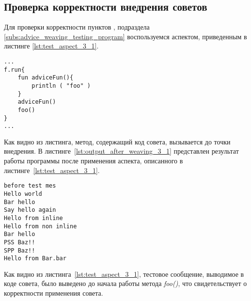 \subsection{Проверка корректности внедрения советов}
\label{sub:advice_code_weaving_tests}
Для проверки корректности пунктов \quotes{\ref{list:before_advice_weaving_check}},
\quotes{\ref{list:program_work_check}}  подраздела \ref{subs:advice_weaving_testing_program} воспользуемся аспектом, приведенным в листинге \ref{lst:test_aspect_3_1}.
\begin{lstlisting}[style={java}, label={lst:result_of_weaving_3_1},
 caption={Результат применения аспекта, описанного в листинге~\ref{lst:test_aspect_3_1}, к тестовой программе}]
...
f.run{
	fun adviceFun(){
		println ( "foo" )
	}
	adviceFun()
	foo()
}
...
\end{lstlisting}
Как видно из листинга, метод, содержащий код совета, вызывается до точки внедрения.
В листинге~\ref{lst:output_after_weaving_3_1} представлен результат работы программы после применения аспекта, описанного в листинге~\ref{lst:test_aspect_3_1}. 
\begin{lstlisting}[style={java}, label={lst:output_after_weaving_3_1},
 caption={Результат работы программы после применения аспекта, описанного в листинге~\ref{lst:test_aspect_3_1}}]
before test mes
Hello world
Bar hello
Say hello again
Hello from inline
Hello from non inline
Bar hello
PSS Baz!!
SPP Baz!!
Hello from Bar.bar
\end{lstlisting}
Как видно из листинга~\ref{lst:test_aspect_3_1}, тестовое сообщение, выводимое в коде совета, было выведено до начала работы метода \textit{foo()}, что свидетельствует о корректности применения совета.

